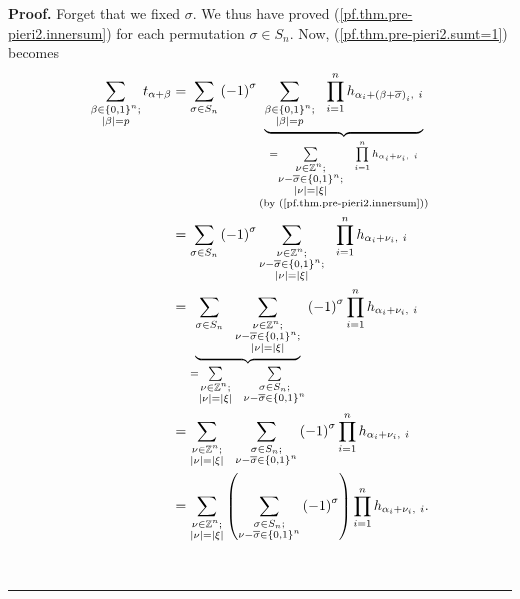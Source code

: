 \documentclass
[numbers=enddot,12pt,final,onecolumn,notitlepage,english]{scrartcl}%
\theoremstyle{definition}
\newenvironment{proof}[1][Proof]{\noindent\textbf{#1.} }{\ \rule{0.5em}{0.5em}}
\let\sumnonlimits\sum
\let\prodnonlimits\prod
\renewcommand{\sum}{\sumnonlimits\limits}
\renewcommand{\prod}{\prodnonlimits\limits}
\newenvironment{verlong}{}{}
\begin{document}
\begin{verlong}
\begin{proof}
Forget that we fixed $\sigma$. We thus have proved
(\ref{pf.thm.pre-pieri2.innersum}) for each permutation $\sigma\in S_{n}$.
Now, (\ref{pf.thm.pre-pieri2.sumt=1}) becomes%
\begin{align}
\sum_{\substack{\beta\in\left\{  0,1\right\}  ^{n};\\\left\vert \beta
\right\vert =p}}t_{\alpha+\beta}  &  =\sum_{\sigma\in S_{n}}\left(  -1\right)
^{\sigma}\underbrace{\sum_{\substack{\beta\in\left\{  0,1\right\}
^{n};\\\left\vert \beta\right\vert =p}}\ \ \prod_{i=1}^{n}h_{\alpha
_{i}+\left(  \beta+\overline{\sigma}\right)  _{i},\ i}}_{\substack{=\sum
_{\substack{\nu\in\mathbb{Z}^{n};\\\nu-\overline{\sigma}\in\left\{
0,1\right\}  ^{n};\\\left\vert \nu\right\vert =\left\vert \xi\right\vert
}}\ \ \prod_{i=1}^{n}h_{\alpha_{i}+\nu_{i},\ i}\\\text{(by
(\ref{pf.thm.pre-pieri2.innersum}))}}}\nonumber\\
&  =\sum_{\sigma\in S_{n}}\left(  -1\right)  ^{\sigma}\sum_{\substack{\nu
\in\mathbb{Z}^{n};\\\nu-\overline{\sigma}\in\left\{  0,1\right\}
^{n};\\\left\vert \nu\right\vert =\left\vert \xi\right\vert }}\ \ \prod
_{i=1}^{n}h_{\alpha_{i}+\nu_{i},\ i}\nonumber\\
&  =\underbrace{\sum_{\sigma\in S_{n}}\ \ \sum_{\substack{\nu\in\mathbb{Z}%
^{n};\\\nu-\overline{\sigma}\in\left\{  0,1\right\}  ^{n};\\\left\vert
\nu\right\vert =\left\vert \xi\right\vert }}}_{=\sum_{\substack{\nu
\in\mathbb{Z}^{n};\\\left\vert \nu\right\vert =\left\vert \xi\right\vert
}}\ \ \sum_{\substack{\sigma\in S_{n};\\\nu-\overline{\sigma}\in\left\{
0,1\right\}  ^{n}}}}\left(  -1\right)  ^{\sigma}\prod_{i=1}^{n}h_{\alpha
_{i}+\nu_{i},\ i}\nonumber\\
&  =\sum_{\substack{\nu\in\mathbb{Z}^{n};\\\left\vert \nu\right\vert
=\left\vert \xi\right\vert }}\ \ \sum_{\substack{\sigma\in S_{n}%
;\\\nu-\overline{\sigma}\in\left\{  0,1\right\}  ^{n}}}\left(  -1\right)
^{\sigma}\prod_{i=1}^{n}h_{\alpha_{i}+\nu_{i},\ i}\nonumber\\
&  =\sum_{\substack{\nu\in\mathbb{Z}^{n};\\\left\vert \nu\right\vert
=\left\vert \xi\right\vert }}\left(  \sum_{\substack{\sigma\in S_{n}%
;\\\nu-\overline{\sigma}\in\left\{  0,1\right\}  ^{n}}}\left(  -1\right)
^{\sigma}\right)  \prod_{i=1}^{n}h_{\alpha_{i}+\nu_{i},\ i}.
\label{pf.thm.pre-pieri2.2}%
\end{align}



\end{proof}
\end{verlong}
\end{document}
